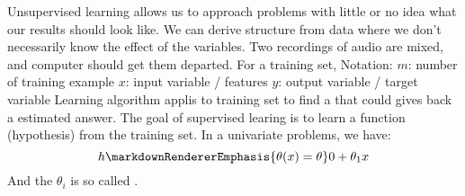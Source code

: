 {}Unsupervised learning allows us to approach problems with little or no idea what our results should look like. We can derive structure from data where we don’t necessarily know the effect of the variables.\markdownRendererInterblockSeparator
{}Two recordings of audio are mixed, and computer should get them departed.\markdownRendererInterblockSeparator
{}\markdownRendererInterblockSeparator
{}\markdownRendererInterblockSeparator
{}For a training set, Notation:\markdownRendererInterblockSeparator
{}\markdownRendererUlBegin
\markdownRendererUlItem $m$: number of training example\markdownRendererUlItemEnd 
\markdownRendererUlItem $x$: input variable / features\markdownRendererUlItemEnd 
\markdownRendererUlItem $y$: output variable / target variable\markdownRendererUlItemEnd 
\markdownRendererUlEnd \markdownRendererInterblockSeparator
{}Learning algorithm applis to training set to find a  that could gives back a estimated answer.\markdownRendererInterblockSeparator
{}The goal of supervised learing is to learn a function (hypothesis) from the training set.\markdownRendererInterblockSeparator
{}\markdownRendererInterblockSeparator
{}In a univariate problems, we have:\markdownRendererInterblockSeparator
{}$$h\markdownRendererEmphasis{\theta(x) = \theta}0 + \theta_1 x$$\markdownRendererInterblockSeparator
{}And the $\theta_i$ is so called .\markdownRendererInterblockSeparator
{}\markdownRendererInterblockSeparator
{}\relax
